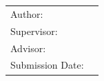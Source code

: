 \begin{titlepage}
  \centering

  \oTUM{38mm}

  \vspace{5mm}
  \begin{spacing}{1.55}
    {\huge\MakeUppercase{\getFaculty{}}}\\
  \end{spacing}

  \vspace{5mm}
  {\large\MakeUppercase{\getUniversity{}}}\\

  \vspace{20mm}
  {\Large \getDoctype{}}

  \vspace{15mm}
  {\huge\bfseries \getTitle{}}

  \vspace{10mm}
  {\huge\bfseries \getTitleGer{}}

  \vspace{10mm}
  \begin{tabular}{l l}
    Author:          & \getAuthor{}         \\
    Supervisor:      & \getSupervisor{}     \\
    Advisor:         & \getAdvisor{}        \\
    Submission Date: & \getSubmissionDate{} \\
  \end{tabular}

\end{titlepage}
\cleardoublepage{}
